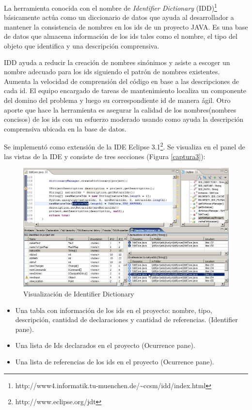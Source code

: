 \documentclass[a4paper,12pt]{report}
\begin{document}
La herramienta conocida con el nombre de \textit{Identifier Dictionary} (IDD)\footnote[1]{http://www4.informatik.tu-muenchen.de/\~{}ccsm/idd/index.html} básicamente actúa como un diccionario de datos que ayuda al desarrollador a mantener la consistencia de nombres en los ids de un proyecto JAVA. Es una base de datos que almacena información de los ids tales como el nombre, el tipo del objeto que identifica y una descripción comprensiva.

IDD ayuda a reducir la creación de nombres sinónimos y asiste a escoger un nombre adecuado para los ids siguiendo el patrón de nombres existentes. Aumenta la velocidad de comprensión del código en base a las descripciones de cada id. El equipo encargado de tareas de mantenimiento localiza un componente del domino del problema y luego su correspondiente id de manera ágil. Otro aporte que hace la herramienta es asegurar la calidad de los nombres(nombres concisos) de los ids con un esfuerzo moderado usando como ayuda la descripción comprensiva ubicada en la base de datos\cite{DFPM05,LFBEX07}.

Se implementó como extensión de la IDE Eclipse 3.1\footnote[2]{http://www.eclipse.org/jdt}. Se visualiza en el panel de las vistas de la IDE y consiste de tres secciones (Figura \ref{captura3}):

\begin{figure}[t] %
\centering
\includegraphics[scale= 0.40]{./idd_3.png}
\caption{Visualización de Identifier Dictionary}
\label{captura4}
\end{figure} 

\begin{itemize}
\itemsep0em%
\item Una tabla con información de los ids en el proyecto: nombre, tipo, descripción, cantidad de declaraciones y cantidad de referencias. (Identifier pane).
\item Una lista de Ids declarados en el proyecto (Ocurrence pane).
\item Una lista de referencias de los ids en el proyecto (Ocurrence pane).
\end{itemize}
\end{document}
